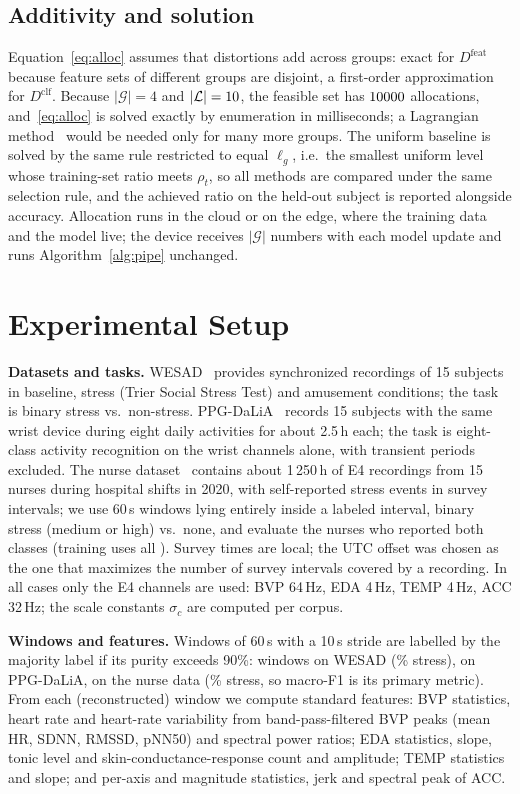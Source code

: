 \documentclass[journal,twoside,web]{ieeecolor}
\begin{document}
\subsection{Additivity and solution}
Equation~\eqref{eq:alloc} assumes that distortions add across groups: exact for $D^{\mathrm{feat}}$ because feature sets of different groups are disjoint, a first-order approximation for $D^{\mathrm{clf}}$. Because $|\mathcal{G}|=4$ and $|\mathcal{L}|=10$, the feasible set has $10000$ allocations, and~\eqref{eq:alloc} is solved exactly by enumeration in milliseconds; a Lagrangian method~\cite{shoham1988} would be needed only for many more groups. The uniform baseline is solved by the same rule restricted to equal $\ell_g$, i.e.\ the smallest uniform level whose training-set ratio meets $\rho_t$, so all methods are compared under the same selection rule, and the achieved ratio on the held-out subject is reported alongside accuracy. Allocation runs in the cloud or on the edge, where the training data and the model live; the device receives $|\mathcal{G}|$ numbers with each model update and runs Algorithm~\ref{alg:pipe} unchanged.

\section{Experimental Setup}
\label{sec:setup}
\textbf{Datasets and tasks.} WESAD~\cite{schmidt2018} provides synchronized recordings of 15 subjects in baseline, stress (Trier Social Stress Test) and amusement conditions; the task is binary stress vs.\ non-stress. PPG-DaLiA~\cite{reiss2019} records 15 subjects with the same wrist device during eight daily activities for about 2.5\,h each; the task is eight-class activity recognition on the wrist channels alone, with transient periods excluded. The nurse dataset~\cite{hosseini2022} contains about 1\,250\,h of E4 recordings from 15 nurses during hospital shifts in 2020, with self-reported stress events in survey intervals; we use 60\,s windows lying entirely inside a labeled interval, binary stress (medium or high) vs.\ none, and evaluate the \nurseNSubjects{} nurses who reported both classes (training uses all \nurseNAll). Survey times are local; the UTC offset was chosen as the one that maximizes the number of survey intervals covered by a recording. In all cases only the E4 channels are used: BVP 64\,Hz, EDA 4\,Hz, TEMP 4\,Hz, ACC 32\,Hz; the scale constants $\sigma_c$ are computed per corpus.

\textbf{Windows and features.} Windows of 60\,s with a 10\,s stride are labelled by the majority label if its purity exceeds 90\%: \nWindows{} windows on WESAD (\pctStress\% stress), \daliaNWindows{} on PPG-DaLiA, \nurseNWindows{} on the nurse data (\nursePctStress\% stress, so macro-F1 is its primary metric). From each (reconstructed) window we compute \nFeatures{} standard features: BVP statistics, heart rate and heart-rate variability from band-pass-filtered BVP peaks (mean HR, SDNN, RMSSD, pNN50) and spectral power ratios; EDA statistics, slope, tonic level and skin-conductance-response count and amplitude; TEMP statistics and slope; and per-axis and magnitude statistics, jerk and spectral peak of ACC.
\end{document}
